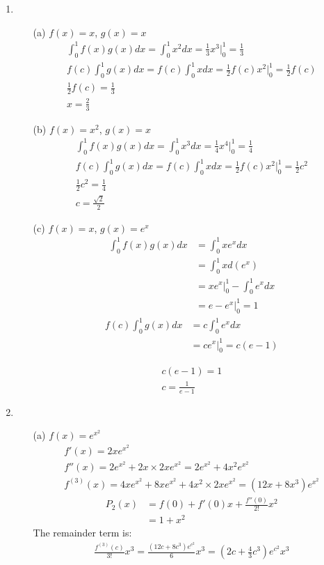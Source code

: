 \documentclass[UTF8]{ctexart}
\begin{document}
\begin{enumerate}
\item \begin{itemize}
\item[(a)] $f(x) = x$, $g(x) = x$ \\
\begin{gather*}
\int_0^1f(x)g(x)dx = \int_0^1x^2dx = \frac{1}{3}x^3|_0^1 = \frac{1}{3} \\
f(c)\int_0^1g(x)dx = f(c) \int_0^1xdx = \frac{1}{2}f(c)x^2|_0^1 = \frac{1}{2}f(c) \\
\frac{1}{2}f(c) = \frac{1}{3} \\
x = \frac{2}{3}
\end{gather*}

\item[(b)] $f(x) = x^2$, $g(x) = x$ \\
\begin{gather*}
\int_0^1f(x)g(x)dx = \int_0^1 x^3 dx = \frac{1}{4}x^4|_0^1 = \frac{1}{4} \\
f(c) \int_0^1g(x) dx = f(c) \int_0^1 x dx = \frac{1}{2} f(c) x^2 |_0^1 = \frac{1}{2} c^2 \\
\frac{1}{2} c^2 = \frac{1}{4} \\
c = \frac{\sqrt 2}{2}
\end{gather*}
\item[(c)] $f(x) = x$, $g(x) = e^x$ 
\begin{align*}
\int_0^1 f(x) g(x) dx &= \int_0^1 xe^x dx \\
&= \int_0^1 x d(e^x) \\
&= xe^x|_0^1 - \int_0^1 e^x dx \\
&= e - e^x|_0^1 = 1
\end{align*}
\begin{align*}
f(c) \int_0^1 g(x) dx &= c \int_0^1 e^x dx \\
&= c e^x|_0^1 = c(e-1)
\end{align*}

\begin{gather*}
c(e-1) = 1 \\
c = \frac{1}{e-1}
\end{gather*}

\end{itemize}

\item \begin{itemize}
\item[(a)] $f(x) = e^{x^2}$
\begin{gather*}
f'(x) = 2xe^{x^2} \\
f''(x) = 2e^{x^2} + 2x \times 2xe^{x^2} = 2e^{x^2} + 4x^2 e^{x^2} \\
f^{(3)}(x) = 4xe^{x^2} + 8xe^{x^2} + 4x^2 \times 2xe^{x^2} = (12x + 8x^3)e^{x^2}
\end{gather*}
\begin{align*}
P_2(x) &= f(0) + f'(0)x + \frac{f''(0)}{2!}x^2 \\
&= 1 + x^2
\end{align*}
The remainder term is:
\begin{align*}
\frac{f^{(3)}(c)}{3!} x^3 = \frac{(12c + 8c^3)e^{c^2}}{6} x^3 = (2c + \frac{4}{3}c^3)e^{c^2} x^3
\end{align*}


\end{itemize}
\end{enumerate}
\end{document}
